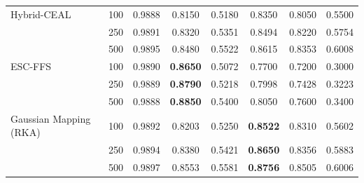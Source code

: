 \documentclass[preprint,12pt]{elsarticle}
\begin{document}
\begin{table}[!t]
{\begin{tabular}{ll|cccccc}
 Hybrid-CEAL &  100       & \multicolumn{1}{c|}{0.9888}          & \multicolumn{1}{c|}{0.8150}          & \multicolumn{1}{c|}{0.5180}          & \multicolumn{1}{c|}{0.8350}          & \multicolumn{1}{c|}{0.8050}          &  0.5500          \\
                          &  250       & \multicolumn{1}{c|}{0.9891}          & \multicolumn{1}{c|}{0.8320}          & \multicolumn{1}{c|}{0.5351}          & \multicolumn{1}{c|}{0.8494}          & \multicolumn{1}{c|}{0.8220}          &  0.5754          \\
                          &  500       & \multicolumn{1}{c|}{0.9895}          & \multicolumn{1}{c|}{0.8480}          & \multicolumn{1}{c|}{0.5522}          & \multicolumn{1}{c|}{0.8615}          & \multicolumn{1}{c|}{0.8353}          &  0.6008          \\ \hline

ESC-FFS                   & 100      & \multicolumn{1}{c|}{0.9890}          & \multicolumn{1}{c|}{\textbf{0.8650}} & \multicolumn{1}{c|}{0.5072}          & \multicolumn{1}{c|}{0.7700}          & \multicolumn{1}{c|}{0.7200}          & 0.3000          \\
                          & 250      & \multicolumn{1}{c|}{0.9889}          & \multicolumn{1}{c|}{\textbf{0.8790}} & \multicolumn{1}{c|}{0.5218}          & \multicolumn{1}{c|}{0.7998}          & \multicolumn{1}{c|}{0.7428}          & 0.3223          \\
                          & 500      & \multicolumn{1}{c|}{0.9888}          & \multicolumn{1}{c|}{\textbf{0.8850}} & \multicolumn{1}{c|}{0.5400}          & \multicolumn{1}{c|}{0.8050}          & \multicolumn{1}{c|}{0.7600}          & 0.3400          \\ \hline

Gaussian Mapping (RKA)        &  100       & \multicolumn{1}{c|}{0.9892}          & \multicolumn{1}{c|}{0.8203}          & \multicolumn{1}{c|}{0.5250}          & \multicolumn{1}{c|}{\textbf{0.8522}} & \multicolumn{1}{c|}{0.8310}          &  0.5602          \\
                          &  250       & \multicolumn{1}{c|}{0.9894}          & \multicolumn{1}{c|}{0.8380}          & \multicolumn{1}{c|}{0.5421}          & \multicolumn{1}{c|}{\textbf{0.8650}} & \multicolumn{1}{c|}{0.8356}          &  0.5883          \\
                          &  500       & \multicolumn{1}{c|}{0.9897}          & \multicolumn{1}{c|}{0.8553}          & \multicolumn{1}{c|}{0.5581}          & \multicolumn{1}{c|}{\textbf{0.8756}} & \multicolumn{1}{c|}{0.8505}          &  0.6006          \\ \hline


\end{tabular}}
\end{table}
\end{document}
